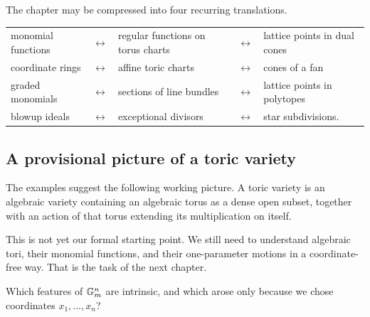 \begin{threedictionaries}
The chapter may be compressed into four recurring translations.

\medskip

\begin{center}
\small
\begin{tabularx}{\linewidth}{@{}
  >{\raggedright\arraybackslash}X
  >{\centering\arraybackslash}p{1.0cm}
  >{\raggedright\arraybackslash}X
  >{\centering\arraybackslash}p{1.0cm}
  >{\raggedright\arraybackslash}X@{}}
monomial functions
&
\(\longleftrightarrow\)
&
regular functions on torus charts
&
\(\longleftrightarrow\)
&
lattice points in dual cones
\\[2mm]
coordinate rings
&
\(\longleftrightarrow\)
&
affine toric charts
&
\(\longleftrightarrow\)
&
cones of a fan
\\[2mm]
graded monomials
&
\(\longleftrightarrow\)
&
sections of line bundles
&
\(\longleftrightarrow\)
&
lattice points in polytopes
\\[2mm]
blowup ideals
&
\(\longleftrightarrow\)
&
exceptional divisors
&
\(\longleftrightarrow\)
&
star subdivisions.
\end{tabularx}
\end{center}
\end{threedictionaries}

\subsection*{A provisional picture of a toric variety}

The examples suggest the following working picture. A toric variety
is an algebraic variety containing an algebraic torus as a dense open
subset, together with an action of that torus extending its
multiplication on itself.

This is not yet our formal starting point. We still need to understand
algebraic tori, their monomial functions, and their one-parameter
motions in a coordinate-free way. That is the task of the next
chapter.

\begin{guidingquestion}
Which features of \(\mathbb{G}_{m}^n\) are intrinsic, and which arose only
because we chose coordinates \(x_1,\ldots,x_n\)?
\end{guidingquestion}


\clearpage

